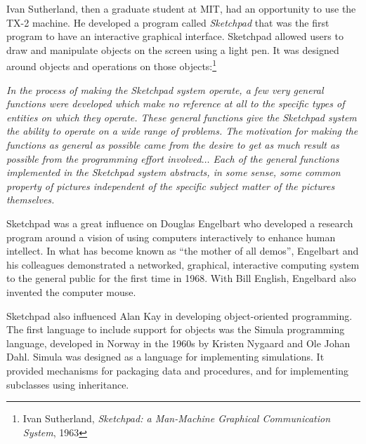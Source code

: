 \begin{schemeregion}
Ivan Sutherland, then a graduate student at MIT, had an opportunity to use the TX-2 machine.  He developed a program called \emph{Sketchpad} that was the first program to have an interactive graphical interface.  Sketchpad allowed users to draw and manipulate objects on the screen using a light pen.  It was designed around objects and operations on those objects:\footnote{Ivan Sutherland, \emph{Sketchpad: a Man-Machine Graphical Communication System}, 1963}
\begin{smallquote}
{\em In the process of making the Sketchpad system operate, a few very general functions were developed which make no reference at all to the specific types of entities on which they operate. These general functions give the Sketchpad system the ability to operate on a wide range of problems. The motivation for making the functions as general as possible came from the desire to get as much result as possible from the programming effort involved$\ldots$  Each of the general functions implemented in the Sketchpad system abstracts, in some sense, some common property of pictures independent of the specific subject matter of the pictures themselves.}
\end{smallquote}
Sketchpad was a great influence on Douglas Engelbart who developed a research program around a vision of using computers interactively to enhance human intellect.  In what has become known as ``the mother of all demos'', Engelbart and his colleagues demonstrated a networked, graphical, interactive computing system to the general public for the first time in 1968.  With Bill English, Engelbard also invented the computer mouse.

Sketchpad also influenced Alan Kay in developing object-oriented programming.  The first language to include support for objects was the Simula programming language, developed in Norway in the 1960s by Kristen Nygaard and Ole Johan Dahl.  Simula was designed as a language for implementing simulations.  It provided mechanisms for packaging data and procedures, and for implementing subclasses using inheritance.


\end{schemeregion}
